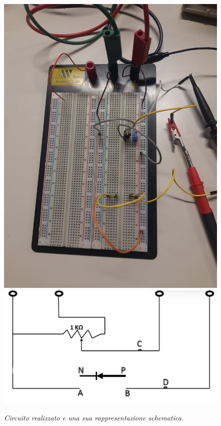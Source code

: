 \documentclass{article}
\begin{document}
\begin{figure}[]
  \centering
  \includegraphics[scale=0.11]{Diod.jpg}
  \qquad
  \includegraphics[scale=0.55]{Circ1.png}
  \qquad
  \caption{\textit{Circuito realizzato e una sua rappresentazione schematica. }}
\end{figure}
\end{document}
